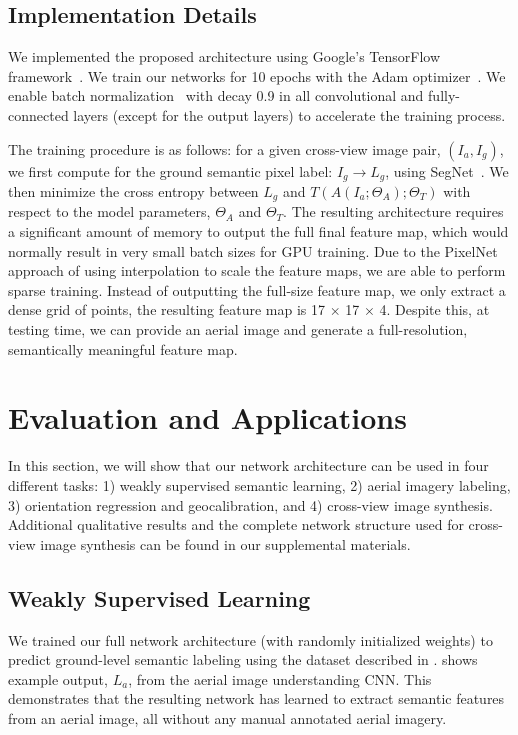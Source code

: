 \subsection{Implementation Details}
\label{sec:details}

We implemented the proposed architecture using Google's TensorFlow
framework~\cite{abadi2016tensorflow}. We train our networks for 10
epochs with the Adam optimizer~\cite{kingma2014adam}. We enable batch
normalization~\cite{ioffe2015batch} with decay 0.9 in all convolutional and 
fully-connected layers (except for the output layers) to accelerate
the training process. 

The training procedure is as follows: for a given cross-view image
pair, $(I_a, I_g)$, we first compute for the ground semantic pixel
label: $I_g \rightarrow L_g$, using
SegNet~\cite{badrinarayanan2015segnet}. We then minimize the cross
entropy between $L_g$ and $T(A(I_a;\Theta_A);\Theta_T)$ with respect
to the model parameters, $\Theta_A$ and $\Theta_T$.  The resulting
architecture requires a significant amount of memory to output the
full final feature map, which would normally result in very small
batch sizes for GPU training.  Due to the PixelNet approach of using
interpolation to scale the feature maps, we are able to perform sparse
training. Instead of outputting the full-size feature map, we only
extract a dense grid of points, the resulting feature map is 17
$\times$ 17 $\times$ 4.  Despite this, at testing time,  we can provide
an aerial image and generate a full-resolution, semantically meaningful
feature map.

\section{Evaluation and Applications}
\label{sec:evaluation}
In this section, we will show that our network architecture can be
used in four different tasks: 1) weakly supervised semantic learning, 
2) aerial imagery labeling, 3) orientation regression and geocalibration, 
and 4) cross-view image synthesis. Additional qualitative results and 
the complete network structure used for cross-view image synthesis 
can be found in our supplemental materials.

\subsection{Weakly Supervised Learning}
\label{sec:transfer}

We trained our full network architecture (with randomly initialized
weights) to predict ground-level semantic labeling using the dataset
described in .   shows example output,
$L_a$, from the aerial image understanding CNN. This demonstrates that
the resulting network has learned to extract semantic features from an
aerial image, all without any manual annotated aerial imagery.

